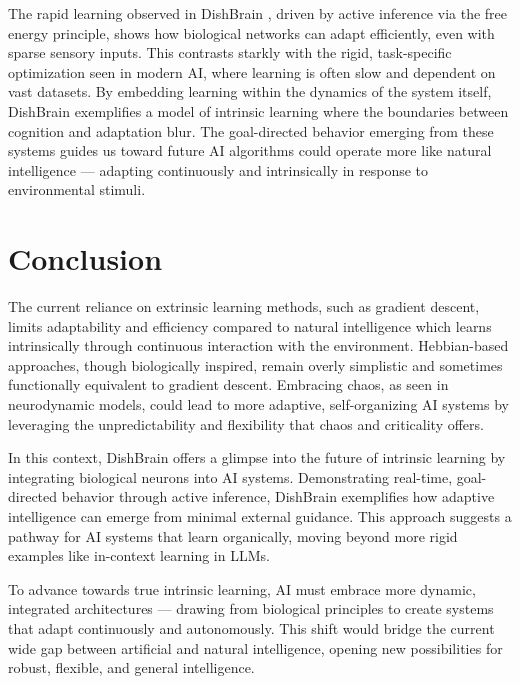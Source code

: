 \documentclass{article}
\begin{document}
The rapid learning observed in DishBrain \cite{Habibollahi2022}, driven
by active inference via the free energy principle, shows how biological
networks can adapt efficiently, even with sparse sensory inputs. This
contrasts starkly with the rigid, task-specific optimization seen in
modern AI, where learning is often slow and dependent on vast datasets. By
embedding learning within the dynamics of the system itself, DishBrain
exemplifies a model of intrinsic learning where the boundaries between
cognition and adaptation blur. The goal-directed behavior emerging from
these systems guides us toward future AI algorithms could operate more
like natural intelligence --- adapting continuously and intrinsically
in response to environmental stimuli.


\section{Conclusion}

The current reliance on extrinsic learning methods, such as gradient
descent, limits adaptability and efficiency compared to natural
intelligence which learns intrinsically through continuous interaction
with the environment. Hebbian-based approaches, though biologically
inspired, remain overly simplistic and sometimes functionally equivalent
to gradient descent. Embracing chaos, as seen in neurodynamic models,
could lead to more adaptive, self-organizing AI systems by leveraging
the unpredictability and flexibility that chaos and criticality offers.

In this context, DishBrain offers a glimpse into the future of intrinsic
learning by integrating biological neurons into AI systems. Demonstrating
real-time, goal-directed behavior through active inference, DishBrain
exemplifies how adaptive intelligence can emerge from minimal external
guidance. This approach suggests a pathway for AI systems that learn
organically, moving beyond more rigid examples like in-context learning
in LLMs.

To advance towards true intrinsic learning, AI must embrace more dynamic,
integrated architectures --- drawing from biological principles to
create systems that adapt continuously and autonomously. This shift would
bridge the current wide gap between artificial and natural intelligence,
opening new possibilities for robust, flexible, and general intelligence.





\end{document}
